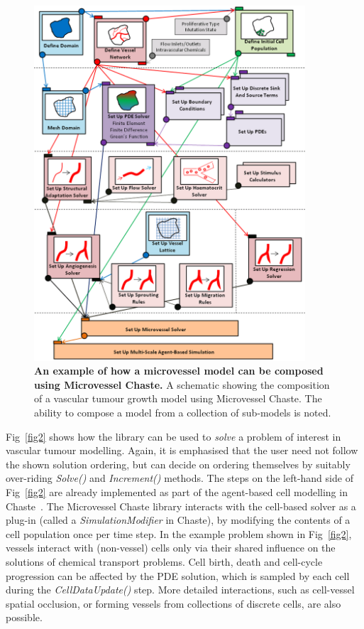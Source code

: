 \documentclass[10pt,letterpaper]{article}
\begin{document}
\begin{figure}[!h]
\centering
\includegraphics[width=0.9\textwidth]{Fig1.png}
\caption{{\bf An example of how a microvessel model can be composed using Microvessel Chaste.}
A schematic showing the composition of a vascular tumour growth model using Microvessel Chaste. The ability to compose a model from a collection of sub-models is noted.}
\label{fig1}
\end{figure}

Fig~\ref{fig2} shows how the library can be used to \emph{solve} a problem of interest in vascular tumour modelling. Again, it is emphasised that the user need not follow the shown solution ordering, but can decide on ordering themselves by suitably over-riding \textit{Solve()} and \textit{Increment()} methods. The steps on the left-hand side of Fig~\ref{fig2} are already implemented as part of the agent-based cell modelling in Chaste~\cite{Mirams2013}. The Microvessel Chaste library interacts with the cell-based solver as a plug-in (called a \textit{SimulationModifier} in Chaste), by modifying the contents of a cell population once per time step. In the example problem shown in Fig~\ref{fig2}, vessels interact with (non-vessel) cells only via their shared influence on the solutions of chemical transport problems. Cell birth, death and cell-cycle progression can be affected by the PDE solution, which is sampled by each cell during the \textit{CellDataUpdate()} step. More detailed interactions, such as cell-vessel spatial occlusion, or forming vessels from collections of discrete cells, are also possible.
\end{document}
